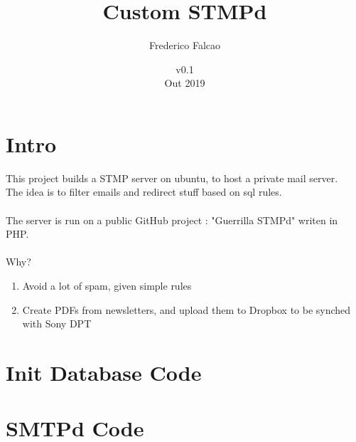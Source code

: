 \documentclass[12pt]{article}
\begin{document}
\title{Custom STMPd}
\author{Frederico Falcao}
\date{v0.1 \\ Out 2019}
\maketitle

\newpage
\section{Intro}
This project builds a STMP server on ubuntu, to host a private mail server. \\
The idea is to filter emails and redirect stuff based on sql rules.\\
\\
The server is run on a public GitHub project : "Guerrilla STMPd" writen in PHP. \\
\\
Why?
\begin{enumerate}
\item Avoid a lot of spam, given simple rules
\item Create PDFs from newsletters, and upload them to Dropbox to be synched with Sony DPT
\end{enumerate}




\newpage
\section{Init Database Code}



\section{SMTPd Code}

\end{document}
